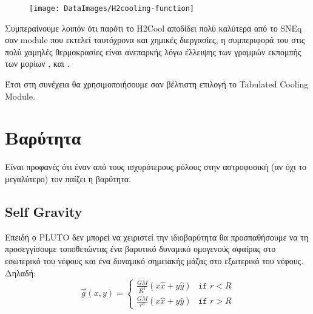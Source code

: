 %
	\begin{figure}[h]
		\centering
		\texttt{[image: DataImages/Η2cooling-function]}
		\caption{}
		\label{fig:h2cooling-function}
	\end{figure}
	
%

 Συμπεραίνουμε λοιπόν ότι παρότι το H2Cool αποδίδει πολύ καλύτερα από το SNEq σαν module που εκτελεί ταυτόχρονα και χημικές διεργασίες, η συμπεριφορά του στις πολύ χαμηλές θερμοκρασίες είναι ανεπαρκής λόγω έλλειψης των γραμμών εκπομπής των μορίων ,  και .

 Έτσι στη συνέχεια θα χρησιμοποιήσουμε σαν βέλτιστη επιλογή το Tabulated Cooling Module.

	\newpage
	
	\section{Βαρύτητα}
	Είναι προφανές ότι έναν από τους ισχυρότερους ρόλους στην αστροφυσική (αν όχι το μεγαλύτερο) τον παίζει η βαρύτητα. 
	
	\subsection{Self Gravity}
	\label{par:SolidSphereSelfGravit}
	Επειδή ο PLUTO δεν μπορεί να χειριστεί την ιδιοβαρύτητα θα προσπαθήσουμε να τη προσεγγίσουμε τοποθετώντας ένα βαρυτικό δυναμικό ομογενούς σφαίρας στο εσωτερικό του νέφους και ένα δυναμικό σημειακής μάζας στο εξωτερικό του νέφους. Δηλαδή:
	\begin{equation}
		\vec{g}(x,y) = 
		\begin{cases}
			\frac{GM}{R^3}(x \hat{x}+ y \hat{y}) &\texttt{if } r<R \\
			\frac{GM}{r^3}(x \hat{x}+ y \hat{y}) &\texttt{if } r>R
		\end{cases}
	\end{equation}
	
